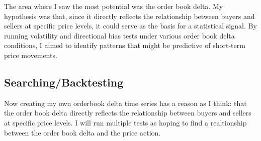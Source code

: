 \documentclass[12pt]{article}
\begin{document}
The area where I saw the most potential was the order book delta. My hypothesis was that, since it directly reflects the relationship between buyers and sellers at specific price levels, it could serve as the basis for a statistical signal. By running volatility and directional bias tests under various order book delta conditions, I aimed to identify patterns that might be predictive of short-term price movements.







\newpage

\subsection*{Searching/Backtesting}
Now creating my own orderbook delta time series has a reason as I think: that the order book delta directly reflects the relationship between buyers and sellers at specific price levels. I will run multiple tests as hoping to find a realtionship between the order book delta and the price action.
\end{document}
